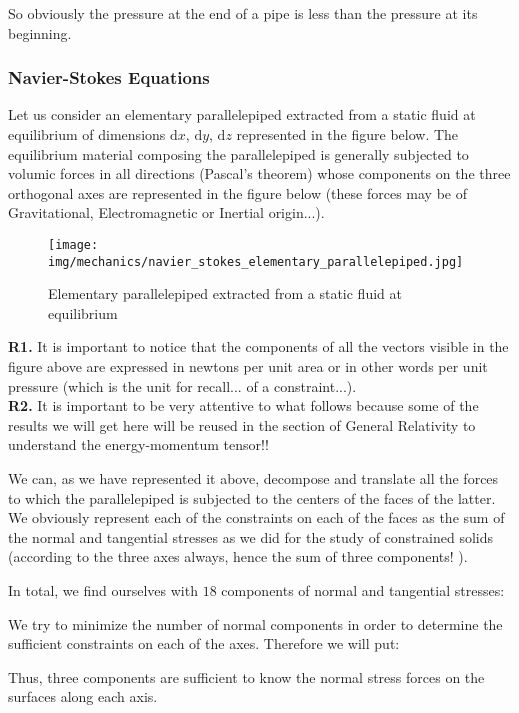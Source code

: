 	So obviously the pressure at the end of a pipe is less than the pressure at its beginning.

	\pagebreak
	\subsubsection{Navier-Stokes Equations}
	Let us consider an elementary parallelepiped extracted from a static fluid at equilibrium of dimensions $\mathrm{d}x$, $\mathrm{d}y$, $\mathrm{d}z$ represented in the figure below. The equilibrium material composing the parallelepiped is generally subjected to volumic forces in all directions (Pascal's theorem) whose components on the three orthogonal axes are represented in the figure below (these forces may be of Gravitational, Electromagnetic or Inertial origin...).
	\begin{figure}[H]
		\centering
		\texttt{[image: img/mechanics/navier\_stokes\_elementary\_parallelepiped.jpg]}
		\caption{Elementary parallelepiped extracted from a static fluid at equilibrium}
	\end{figure}
	\begin{tcolorbox}[title=Remarks,colframe=black,arc=10pt]
	\textbf{R1.} It is important to notice that the components of all the vectors visible in the figure above are expressed in newtons per unit area or in other words per unit pressure (which is the unit for recall... of a constraint...).\\
	
	\textbf{R2.} It is important to be very attentive to what follows because some of the results we will get here will be reused in the section of General Relativity to understand the energy-momentum tensor!!
	\end{tcolorbox}
	We can, as we have represented it above, decompose and translate all the forces to which the parallelepiped is subjected to the centers of the faces of the latter. We obviously represent each of the constraints on each of the faces as the sum of the normal and tangential stresses as we did for the study of constrained solids (according to the three axes always, hence the sum of three components! ).

	In total, we find ourselves with $18$ components of normal and tangential stresses:
	
	We try to minimize the number of normal components in order to determine the sufficient constraints on each of the axes. Therefore we will put:
	
	Thus, three components are sufficient to know the normal stress forces on the surfaces along each axis.

